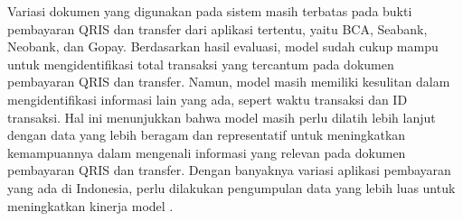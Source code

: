 


Variasi dokumen yang digunakan pada sistem masih terbatas pada bukti pembayaran QRIS dan transfer dari aplikasi tertentu, yaitu BCA, Seabank, Neobank, dan Gopay. Berdasarkan hasil evaluasi, model \donut{} sudah cukup mampu untuk mengidentifikasi total transaksi yang tercantum pada dokumen pembayaran QRIS dan transfer. Namun, model masih memiliki kesulitan dalam mengidentifikasi informasi lain yang ada, sepert waktu transaksi dan ID transaksi. Hal ini menunjukkan bahwa model masih perlu dilatih lebih lanjut dengan data yang lebih beragam dan representatif untuk meningkatkan kemampuannya dalam mengenali informasi yang relevan pada dokumen pembayaran QRIS dan transfer. Dengan banyaknya variasi aplikasi pembayaran yang ada di Indonesia, perlu dilakukan pengumpulan data yang lebih luas untuk meningkatkan kinerja model \donut{}.


